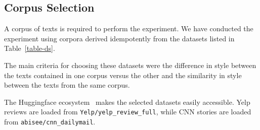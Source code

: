 \documentclass[a4paper,twoside]{article}
\begin{document}
\subsection{Corpus Selection}\label{ds-selection}

A corpus of texts is required to perform the experiment.
We have conducted the experiment using corpora derived idempotently from the
datasets listed in Table~\ref{table-ds}.

The main criteria for choosing these datasets were the difference in style
between the texts contained in one corpus versus the other and the similarity in
style between the texts from the same corpus.

\begin{table}[ht!]
    \setlength\tabcolsep{6pt}
    \centering
    \caption{Source Datasets}\label{table-ds}
\end{table}

The Huggingface ecosystem~\cite{lhoest-etal-2021-datasets} makes the selected
datasets easily accessible.
Yelp reviews are loaded from \texttt{Yelp/yelp\_review\_full}, while CNN stories
are loaded from \texttt{abisee/cnn\_dailymail}.
\end{document}
